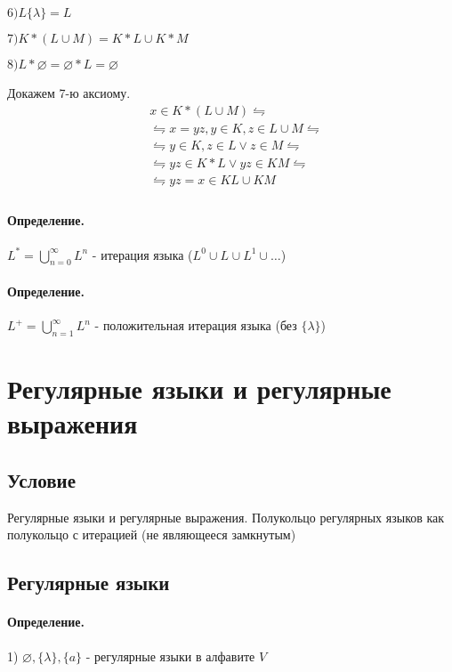 \documentclass{report}
\begin{document}
   $6) L \{\lambda\} = L$ 

   $7) K*(L \cup M) = K*L \cup K*M$

   $8) L * \varnothing = \varnothing * L = \varnothing$
 
\medskip

Докажем 7-ю аксиому.
\[
\begin{align*}
&x \in K*(L \cup M) \leftrightharpoons \\
&\leftrightharpoons x = yz, y \in K,z \in L \cup M \leftrightharpoons\\
&\leftrightharpoons y \in K, z\in L \lor z \in M \leftrightharpoons \\
& \leftrightharpoons yz \in K*L \lor yz \in KM \leftrightharpoons \\
&\leftrightharpoons yz = x \in KL \cup KM \\
\end{align*}
\] 

\medskip

\paragraph*{Определение.}
$L^{*}=\bigcup_{n=0}^{\infty}L^{n} $ - итерация языка ($L^{0} \cup L^{} \cup L^{1} \cup \ldots $)

\paragraph*{Определение.}
$L^{+}=\bigcup_{n=1}^{\infty}L^{n} $ - положительная итерация языка (без $\{\lambda\} $)

\newpage

\section{Регулярные языки и регулярные выражения}
\subsection{Условие}
 Регулярные языки и регулярные выражения. Полукольцо регулярных языков как
полукольцо с итерацией (не являющееся замкнутым)

\subsection{Регулярные языки}

\paragraph*{Определение.}
1) $\varnothing, \{\lambda\}, \{a\}  $ - регулярные языки в алфавите $V$
\end{document}

